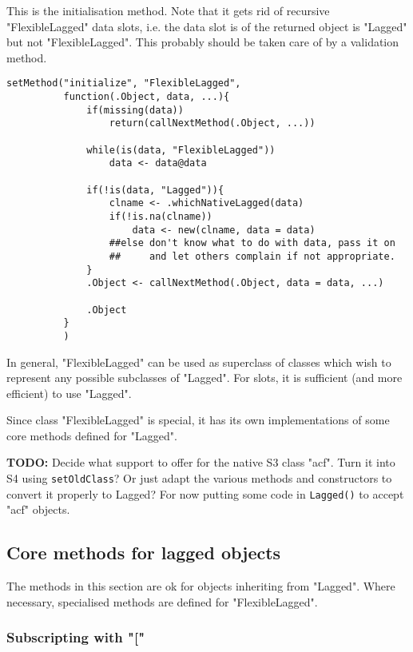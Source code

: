 \documentclass[11pt,a4paper]{article}
\begin{document}
This is the initialisation method. Note that it gets rid of recursive "FlexibleLagged" data
slots, i.e. the data slot is of the returned object is "Lagged" but not "FlexibleLagged".
This probably should be taken care of by a validation method.
\begin{verbatim}
setMethod("initialize", "FlexibleLagged",
          function(.Object, data, ...){
              if(missing(data))
                  return(callNextMethod(.Object, ...))

              while(is(data, "FlexibleLagged"))
                  data <- data@data

              if(!is(data, "Lagged")){
                  clname <- .whichNativeLagged(data)
                  if(!is.na(clname))
                      data <- new(clname, data = data)
                  ##else don't know what to do with data, pass it on
                  ##     and let others complain if not appropriate.
              }
              .Object <- callNextMethod(.Object, data = data, ...)

              .Object
          }
          )
\end{verbatim}
In general, "FlexibleLagged" can be used as superclass of classes which wish to represent any
possible subclasses of "Lagged". For slots, it is sufficient (and more efficient) to use
"Lagged".

Since class "FlexibleLagged" is special, it has its own implementations of some core methods
defined for "Lagged".

\textbf{TODO:} Decide what support to offer for the native S3 class "acf". Turn it into S4 using
\texttt{setOldClass}? Or just adapt the various methods and constructors to convert it properly to
Lagged? For now putting some code in \texttt{Lagged()} to accept "acf" objects.

\subsection{Core methods for lagged objects}
\label{sec:org8f6db68}

The methods in this section are ok for objects inheriting from "Lagged". Where
necessary, specialised methods are defined for "FlexibleLagged".


\subsubsection{Subscripting with "["}
\label{sec:org3f32f1c}
\end{document}
